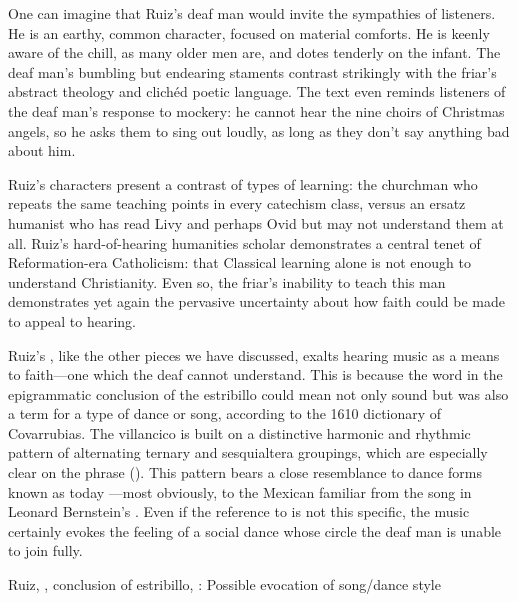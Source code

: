 One can imagine that Ruiz's deaf man would invite the sympathies of listeners.
He is an earthy, common character, focused on material comforts. 
He is keenly aware of the chill, as many older men are, and dotes tenderly on
the infant.  
The deaf man's bumbling but endearing staments contrast strikingly with the 
friar's abstract theology and clichéd poetic language.
The text even reminds listeners of the deaf man's response to mockery: he cannot
hear the nine choirs of Christmas angels, so he asks them to sing out loudly, as
long as they don't say anything bad about him.

Ruiz's characters present a contrast of types of learning: the churchman who 
repeats the same teaching points in every catechism class, versus an ersatz 
humanist who has read Livy and perhaps Ovid but may not understand them at all.
Ruiz's hard-of-hearing humanities scholar demonstrates a central tenet of 
Reformation-era Catholicism: that Classical learning alone is not enough to 
understand Christianity.%
    \Autocite
    [206, .]
    {Erasmus:Dolan}
Even so, the friar's inability to teach this man demonstrates yet again the 
pervasive uncertainty about how faith could be made to appeal to hearing.

Ruiz's , like the other pieces we have 
discussed, exalts hearing music as a means to faith---one which the deaf cannot 
understand.
This is because the word  in the epigrammatic conclusion of the 
estribillo could mean not only sound but was also a term for a type of dance or 
song, according to the 1610 dictionary of Covarrubias.
The villancico is built on a distinctive harmonic and rhythmic pattern of 
alternating ternary and sesquialtera groupings, which are especially clear on 
the phrase  ().
This pattern bears a close resemblance to dance forms known as  today 
---most obviously, to the Mexican  familiar from the song
 in Leonard Bernstein's .%
    \Autocite[]{Grove}
Even if the reference to  is not this specific, the music certainly 
evokes the feeling of a social dance whose circle the deaf man is unable to 
join fully.


\begin{exmusic}
    \caption{Ruiz, , conclusion of 
    estribillo, : Possible evocation of  song/dance 
    style}
    \label{exmusic:Ruiz-Sordos-son}
\end{exmusic}

